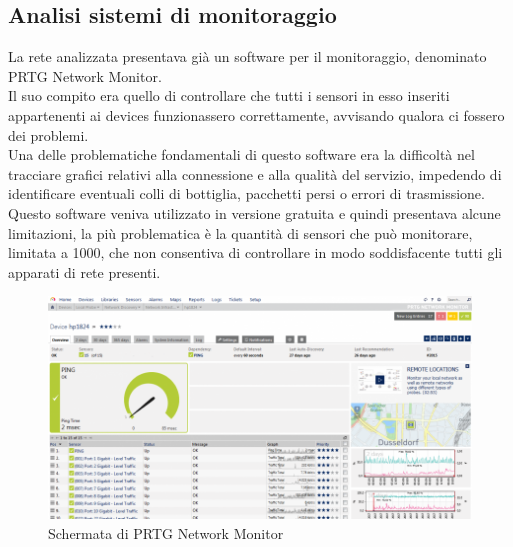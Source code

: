 \documentclass[Realizzazione.tex]{subfiles}
\begin{document}
\subsection{Analisi sistemi di monitoraggio}
La rete analizzata presentava già un software per il monitoraggio, denominato PRTG Network Monitor. \\
Il suo compito era quello di controllare che tutti i sensori in esso inseriti appartenenti ai devices funzionassero correttamente, avvisando qualora ci fossero dei problemi. \\
Una delle problematiche fondamentali di questo software era la difficoltà nel tracciare grafici relativi alla connessione e alla qualità del servizio, impedendo di identificare eventuali colli di bottiglia, pacchetti persi o errori di trasmissione. \\
Questo software veniva utilizzato in versione gratuita e quindi presentava alcune limitazioni, la più problematica è la quantità di sensori che può monitorare, limitata a 1000, che non consentiva di controllare in modo soddisfacente tutti gli apparati di rete presenti. \\

\begin{figure}[H]
	\centering
	\includegraphics[width=0.8\linewidth]{"images/PRTGStatistics"}
	\caption{Schermata di PRTG Network Monitor}
	\label{fig:Schermata di PRTG Network Monitor}
\end{figure}
\end{document}
